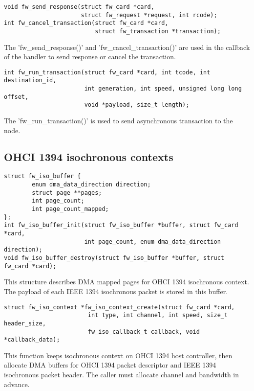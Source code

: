 \documentclass[onecolumn]{jarticle}
\begin{document}
\begin{verbatim}
void fw_send_response(struct fw_card *card,
                      struct fw_request *request, int rcode);
int fw_cancel_transaction(struct fw_card *card,
                          struct fw_transaction *transaction);
\end{verbatim}

The 'fw\_send\_response()' and 'fw\_cancel\_transaction()' are used in the callback of the handler to send response or cancel the transaction.

\begin{verbatim}
int fw_run_transaction(struct fw_card *card, int tcode, int destination_id,
                       int generation, int speed, unsigned long long offset,
                       void *payload, size_t length);
\end{verbatim}

The 'fw\_run\_transaction()' is used to send asynchronous transaction to the node.

\subsection{OHCI 1394 isochronous contexts}

\begin{verbatim}
struct fw_iso_buffer {
        enum dma_data_direction direction;
        struct page **pages;
        int page_count;
        int page_count_mapped;
};
int fw_iso_buffer_init(struct fw_iso_buffer *buffer, struct fw_card *card,
                       int page_count, enum dma_data_direction direction);
void fw_iso_buffer_destroy(struct fw_iso_buffer *buffer, struct fw_card *card);
\end{verbatim}

This structure describes DMA mapped pages for OHCI 1394 isochronous context. The payload of each IEEE 1394 isochronous packet is stored in this buffer. 

\begin{verbatim}
struct fw_iso_context *fw_iso_context_create(struct fw_card *card,
                        int type, int channel, int speed, size_t header_size,
                        fw_iso_callback_t callback, void *callback_data);
\end{verbatim}

This function keeps isochronous context on OHCI 1394 host controller, then allocate DMA buffers for OHCI 1394 packet descriptor and IEEE 1394 isochronous packet header. The caller must allocate channel and bandwidth in advance.
\end{document}
